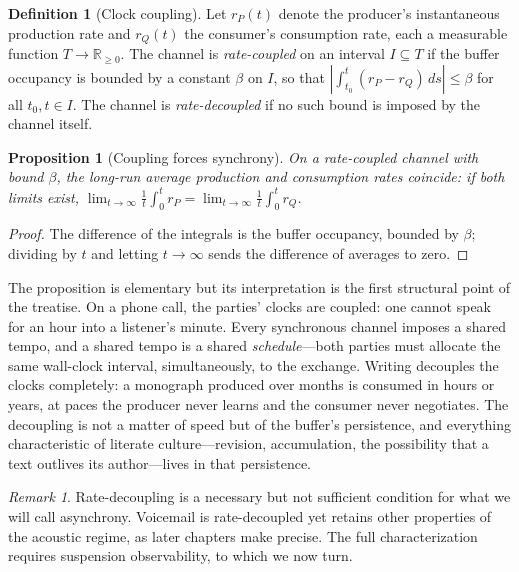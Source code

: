 \documentclass[11pt,oneside]{book}
\theoremstyle{plain}
\newtheorem{proposition}[theorem]{Proposition}
\theoremstyle{definition}
\newtheorem{definition}[theorem]{Definition}
\theoremstyle{remark}
\newtheorem{remark}[theorem]{Remark}
\begin{document}
\begin{definition}[Clock coupling]
Let $r_P(t)$ denote the producer's instantaneous production rate and $r_Q(t)$ the consumer's consumption rate, each a measurable function $T \to \mathbb{R}_{\geq 0}$. The channel is \emph{rate-coupled} on an interval $I \subseteq T$ if the buffer occupancy is bounded by a constant $\beta$ on $I$, so that $\left| \int_{t_0}^{t} (r_P - r_Q)\, ds \right| \leq \beta$ for all $t_0, t \in I$. The channel is \emph{rate-decoupled} if no such bound is imposed by the channel itself.
\end{definition}

\begin{proposition}[Coupling forces synchrony]
On a rate-coupled channel with bound $\beta$, the long-run average production and consumption rates coincide: if both limits exist, $\lim_{t\to\infty} \frac{1}{t}\int_0^t r_P = \lim_{t\to\infty} \frac{1}{t}\int_0^t r_Q$.
\end{proposition}

\begin{proof}
The difference of the integrals is the buffer occupancy, bounded by $\beta$; dividing by $t$ and letting $t \to \infty$ sends the difference of averages to zero.
\end{proof}

The proposition is elementary but its interpretation is the first structural point of the treatise. On a phone call, the parties' clocks are coupled: one cannot speak for an hour into a listener's minute. Every synchronous channel imposes a shared tempo, and a shared tempo is a shared \emph{schedule}---both parties must allocate the same wall-clock interval, simultaneously, to the exchange. Writing decouples the clocks completely: a monograph produced over months is consumed in hours or years, at paces the producer never learns and the consumer never negotiates. The decoupling is not a matter of speed but of the buffer's persistence, and everything characteristic of literate culture---revision, accumulation, the possibility that a text outlives its author---lives in that persistence.

\begin{remark}
Rate-decoupling is a necessary but not sufficient condition for what we will call asynchrony. Voicemail is rate-decoupled yet retains other properties of the acoustic regime, as later chapters make precise. The full characterization requires suspension observability, to which we now turn.
\end{remark}
\end{document}
